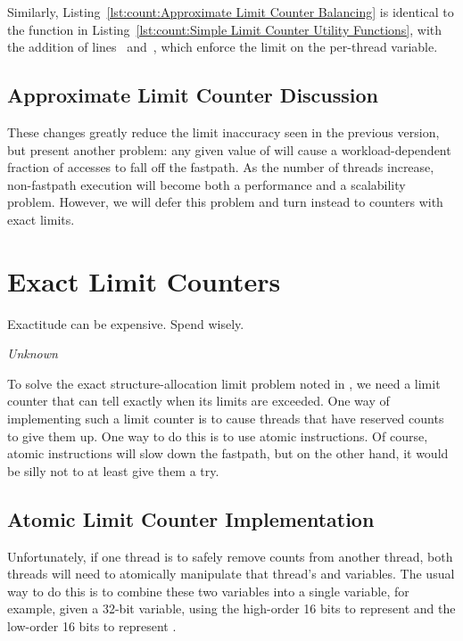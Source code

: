 \begin{fcvref}
Similarly,
Listing~\ref{lst:count:Approximate Limit Counter Balancing}
is identical to the  function in
Listing~\ref{lst:count:Simple Limit Counter Utility Functions},
with the addition of
lines~ and~, which enforce the
 limit on the per-thread  variable.
\end{fcvref}

\subsection{Approximate Limit Counter Discussion}

These changes greatly reduce the limit inaccuracy seen in the previous version,
but present another problem: any given value of 
will cause a workload-dependent fraction of accesses to fall off the
fastpath.
As the number of threads increase, non-fastpath execution will become both
a performance and a scalability problem.
However, we will defer this problem and turn instead to counters
with exact limits.

\section{Exact Limit Counters}
\label{sec:count:Exact Limit Counters}
%
\epigraph{Exactitude can be expensive.  Spend wisely.}{\emph{Unknown}}

%
To solve the exact structure-allocation limit problem noted in
\QuickQuizRef{\QcountQexactcnt},
we need a limit counter that can tell exactly when its limits are
exceeded.
One way of implementing such a limit counter is to
cause threads that have reserved counts to give them up.
One way to do this is to use atomic instructions.
Of course, atomic instructions will slow down the fastpath, but on the
other hand, it would be silly not to at least give them a try.

\subsection{Atomic Limit Counter Implementation}
\label{sec:count:Atomic Limit Counter Implementation}

Unfortunately,
if one thread is to safely remove counts from another thread,
both threads will need to atomically manipulate that thread's
 and  variables.
The usual way to do this is to combine these two variables into a
single variable,
for example, given a 32-bit variable, using the high-order 16 bits to
represent  and the low-order 16 bits to represent
.

